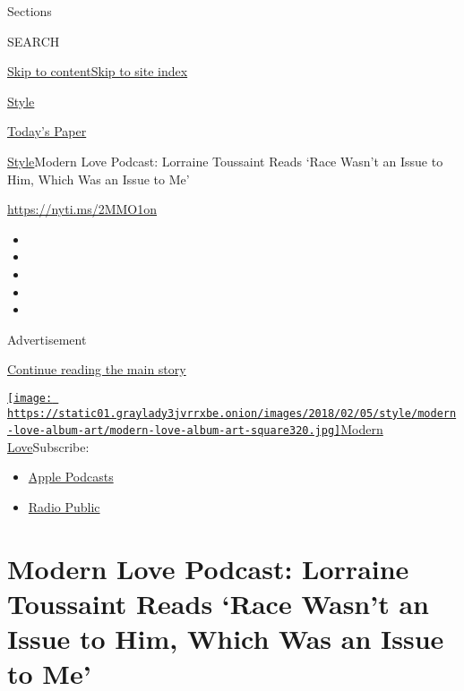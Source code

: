 Sections

SEARCH

\protect\hyperlink{site-content}{Skip to
content}\protect\hyperlink{site-index}{Skip to site index}

\href{https://www.nytimes3xbfgragh.onion/section/style}{Style}

\href{https://myaccount.nytimes3xbfgragh.onion/auth/login?response_type=cookie\&client_id=vi}{}

\href{https://www.nytimes3xbfgragh.onion/section/todayspaper}{Today's
Paper}

\href{/section/style}{Style}\textbar{}Modern Love Podcast: Lorraine
Toussaint Reads `Race Wasn't an Issue to Him, Which Was an Issue to Me'

\url{https://nyti.ms/2MMO1on}

\begin{itemize}
\item
\item
\item
\item
\item
\end{itemize}

Advertisement

\protect\hyperlink{after-top}{Continue reading the main story}

\href{https://www.nytimes3xbfgragh.onion/column/modern-love-podcast}{\texttt{[image: https://static01.graylady3jvrrxbe.onion/images/2018/02/05/style/modern-love-album-art/modern-love-album-art-square320.jpg]}Modern
Love}Subscribe:

\begin{itemize}
\tightlist
\item
  \href{https://itunes.apple.com/us/podcast/id1065559535}{Apple
  Podcasts}
\item
  \href{https://play.radiopublic.com/modern-love-k6pYB8}{Radio Public}
\end{itemize}

\hypertarget{modern-love-podcast-lorraine-toussaint-reads-race-wasnt-an-issue-to-him-which-was-an-issue-to-me}{%
\section{Modern Love Podcast: Lorraine Toussaint Reads `Race Wasn't an
Issue to Him, Which Was an Issue to
Me'}\label{modern-love-podcast-lorraine-toussaint-reads-race-wasnt-an-issue-to-him-which-was-an-issue-to-me}}

\subsection{}


